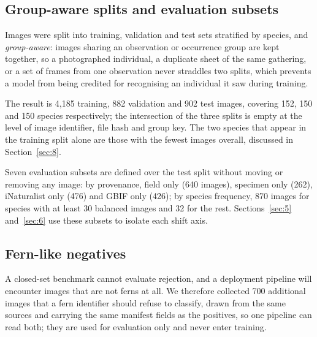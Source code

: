 \documentclass[preprint,12pt,authoryear]{elsarticle}
\begin{document}
\setcounter{section}{3}

\setcounter{subsection}{4}

\subsection{Group-aware splits and evaluation subsets}\label{sec:3.5}

Images were split into training, validation and test sets stratified by species, and \emph{group-aware}: images sharing an observation or occurrence group are kept together, so a photographed individual, a duplicate sheet of the same gathering, or a set of frames from one observation never straddles two splits, which prevents a model from being credited for recognising an individual it saw during training.

The result is 4,185 training, 882 validation and 902 test images, covering 152, 150 and 150 species respectively; the intersection of the three splits is empty at the level of image identifier, file hash and group key. The two species that appear in the training split alone are those with the fewest images overall, discussed in Section~\ref{sec:8}.

Seven evaluation subsets are defined over the test split without moving or removing any image: by provenance, field only (640 images), specimen only (262), iNaturalist only (476) and GBIF only (426); by species frequency, 870 images for species with at least 30 balanced images and 32 for the rest. Sections~\ref{sec:5} and~\ref{sec:6} use these subsets to isolate each shift axis.

\setcounter{section}{3}

\setcounter{subsection}{5}

\subsection{Fern-like negatives}\label{sec:3.6}

A closed-set benchmark cannot evaluate rejection, and a deployment pipeline will encounter images that are not ferns at all. We therefore collected 700 additional images that a fern identifier should refuse to classify, drawn from the same sources and carrying the same manifest fields as the positives, so one pipeline can read both; they are used for evaluation only and never enter training.
\end{document}
